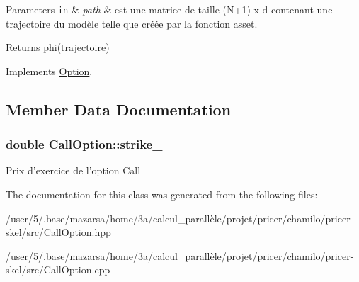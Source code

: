 \begin{DoxyParams}[1]{Parameters}
\mbox{\tt in}  & {\em path} & est une matrice de taille (N+1) x d contenant une trajectoire du modèle telle que créée par la fonction asset. \\
\hline
\end{DoxyParams}
\begin{DoxyReturn}{Returns}
phi(trajectoire) 
\end{DoxyReturn}


Implements \hyperlink{classOption_abe90882a11f5436077425249e3f32204}{Option}.



\subsection{Member Data Documentation}
\hypertarget{classCallOption_a5158e7f6be0b959b51e2e92172a49ebf}{
\subsubsection[{strike\-\_\-}]{\setlength{\rightskip}{0pt plus 5cm}double Call\-Option\-::strike\-\_\-}}\label{classCallOption_a5158e7f6be0b959b51e2e92172a49ebf}
Prix d'exercice de l'option Call 

The documentation for this class was generated from the following files\-:\begin{DoxyCompactItemize}
\item 
/user/5/.\-base/mazarsa/home/3a/calcul\-\_\-parallèle/projet/pricer/chamilo/pricer-\/skel/src/Call\-Option.\-hpp\item 
/user/5/.\-base/mazarsa/home/3a/calcul\-\_\-parallèle/projet/pricer/chamilo/pricer-\/skel/src/Call\-Option.\-cpp\end{DoxyCompactItemize}
